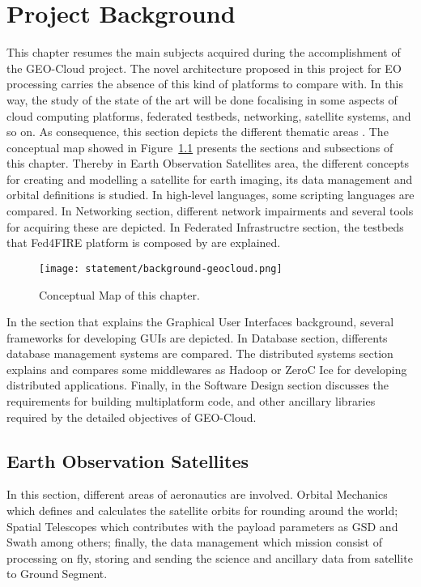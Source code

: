 \chapter{Project Background}
\label{chap:antecedentes}


This chapter resumes the main subjects acquired during the accomplishment of the GEO-Cloud project.  The novel architecture proposed in this project for EO processing carries the absence of this kind of platforms to compare with. In this way, the study of the state of the art will be done focalising in some aspects of cloud computing platforms, federated testbeds, networking, satellite systems, and so on. As consequence, this section depicts the different thematic areas .
The conceptual map showed in Figure~\ref{fig:intr-conceptual-map} presents the sections and subsections of this chapter. Thereby in Earth Observation Satellites area, the different concepts for creating and modelling a satellite for earth imaging, its data management and orbital definitions is studied. In high-level languages, some scripting languages are compared. In Networking section, different network impairments and several tools for acquiring these are depicted. In Federated Infrastructre section, the testbeds that Fed4FIRE platform is composed by are explained.

\begin{figure}[!h]
\begin{center}
\texttt{[image: statement/background-geocloud.png]}
\caption{Conceptual Map of this chapter.}
\label{fig:intr-conceptual-map}
\end{center}
\end{figure}

In the section that explains the Graphical User Interfaces background, several
frameworks for developing GUIs are depicted. In Database section, differents
database management systems are compared. The distributed systems section
explains and compares some middlewares as Hadoop or ZeroC Ice for developing
distributed applications.
Finally, in the Software Design section discusses the requirements for building multiplatform code, and other ancillary libraries required by the detailed objectives of GEO-Cloud.

\section{Earth Observation Satellites}

In this section, different areas of aeronautics are involved. Orbital
Mechanics which defines and calculates the satellite orbits for rounding around
the world;  Spatial Telescopes which contributes with the payload parameters as
\ac{GSD} and Swath among others; finally, the data management which mission consist of processing on fly, storing
and sending the science and ancillary data from satellite to Ground Segment.

